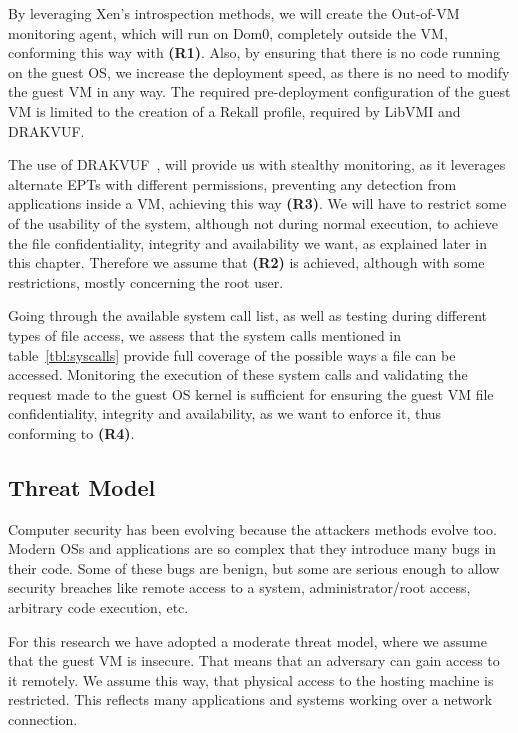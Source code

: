By leveraging Xen's introspection methods, we will create the Out-of-VM monitoring agent, which will run on Dom0, completely outside the \ac{VM}, conforming this way with \textbf{(R1)}. Also, by ensuring that there is no code running on the guest \ac{OS}, we increase the deployment speed, as there is no need to modify the guest \ac{VM} in any way. The required pre-deployment configuration of the guest \ac{VM} is limited to the creation of a Rekall profile, required by LibVMI and DRAKVUF. 
\par The use of DRAKVUF~\cite{lengyel2014drakvuf}, will provide us with stealthy monitoring, as it leverages alternate \ac{EPT}s with different permissions, preventing any detection from applications inside a \ac{VM}, achieving this way \textbf{(R3)}. We will have to restrict some of the usability of the system, although not during normal execution, to achieve the file confidentiality, integrity and availability we want, as explained later in this chapter. Therefore we assume that \textbf{(R2)} is achieved, although with some restrictions, mostly concerning the root user.
\par Going through the available system call list, as well as testing during different types of file access, we assess that the system calls mentioned in table~\ref{tbl:syscalls} provide full coverage of the possible ways a file can be accessed. Monitoring the execution of these system calls and validating the request made to the guest \ac{OS} kernel is sufficient for ensuring the guest \ac{VM} file confidentiality, integrity and availability, as we want to enforce it, thus conforming to \textbf{(R4)}.


\subsection{Threat Model}\label{sub:threat}

Computer security has been evolving because the attackers methods evolve too. Modern \ac{OS}s and applications are so complex that they introduce many bugs in their code. Some of these bugs are benign, but some are serious enough to allow security breaches like remote access to a system, administrator/root access, arbitrary code execution, etc. 

\par For this research we have adopted a moderate threat model, where we assume that the guest \ac{VM} is insecure. That means that an adversary can gain access to it remotely. We assume this way, that physical access to the hosting machine is restricted. This reflects many applications and systems working over a network connection.

